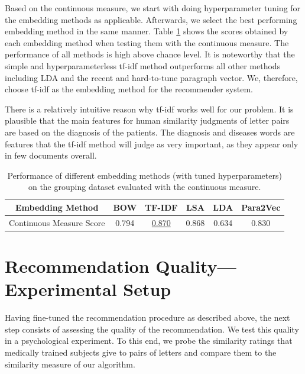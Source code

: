 Based on the continuous measure, we start with doing hyperparameter tuning for the embedding methods as applicable. Afterwards, we select the best performing embedding method in the same manner. Table \ref{table:continuous_measure} shows the scores obtained by each embedding method when testing them with the continuous measure. The performance of all methods is high above chance level. It is noteworthy that the simple and hyperparameterless tf-idf method outperforms all other methods including LDA and the recent and hard-to-tune paragraph vector. We, therefore, choose tf-idf as the embedding method for the recommender system. 

There is a relatively intuitive reason why tf-idf works well for our problem. It is plausible that the main features for human similarity judgments of letter pairs are based on the diagnosis of the patients. The diagnosis and diseases words are features that the tf-idf method will judge as very important, as they appear only in few documents overall. %
\begin{table}
	\begin{tabular}{|c||c|c|c|c|c|}
		\hline 
		Embedding Method & BOW & TF-IDF & LSA & LDA  & Para2Vec\tabularnewline
		\hline 
		\hline 
		Continuous Measure Score & 0.794 & \underline{0.870} & 0.868 & 0.634 & 0.830\tabularnewline
		\hline 
	\end{tabular}
	\caption{Performance of different embedding methods (with tuned hyperparameters) on the grouping dataset evaluated with the continuous measure.}
	\label{table:continuous_measure}
\end{table}



\section{Recommendation Quality---Experimental Setup}
Having fine-tuned the recommendation procedure as described above, the next step consists of assessing the quality of the recommendation. We test this quality in a psychological experiment. To this end, we probe the similarity ratings that medically trained subjects give to pairs of letters and compare them to the similarity measure of our algorithm.


